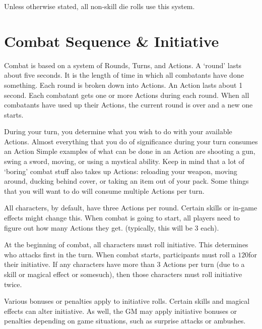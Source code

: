 \documentclass[twoside]{book}
\begin{document}
    {  
    Unless otherwise stated, all non-skill die rolls use
               this system. 
    }
  
    

\section{Combat Sequence \& Initiative}
    
    {  
    Combat is based on a system of Rounds, Turns, and
             Actions. A `round' lasts about five seconds. It
             is the length of time in which all combatants have done
             something. Each round is broken down into Actions. An Action
             lasts about 1 second. Each combatant gets one or more
             Actions during each round. When all combatants have used up
             their Actions, the current round is over and a new one
             starts. 
    }
  
    {  
    During your turn, you determine what you wish to do
             with your available Actions. Almost everything that you do
             of significance during your turn consumes an Action Simple
             examples of what can be done in an Action are shooting a
             gun, swing a sword, moving, or using a mystical ability.
             Keep in mind that a lot of `boring' combat stuff
             also takes up Actions: reloading your weapon, moving around,
             ducking behind cover, or taking an item out of your pack.
             Some things that you will want to do will consume multiple
             Actions per turn. 
    }
  
    {  
    All characters, by default, have three Actions per
             round. Certain skills or in-game effects might change this.
             When combat is going to start, all players need to figure
             out how many Actions they get. (typically, this will be 3
             each). 
    }
  
    {  
    At the beginning of combat, all characters must roll
             initiative. This determines who attacks first in the turn.
             When combat starts, participants must roll a \ensuremath{1}\ensuremath{20}\ensuremath{}for their
             initiative. If any characters have more than 3 Actions per
             turn (due to a skill or magical effect or somesuch), then
             those characters must roll initiative twice. 
    }
  
    {  
    Various bonuses or penalties apply to initiative
             rolls. Certain skills and magical effects can alter
             initiative. As well, the GM may apply initiative bonuses or
             penalties depending on game situations, such as surprise
             attacks or ambushes. 
    }
  
\end{document}
